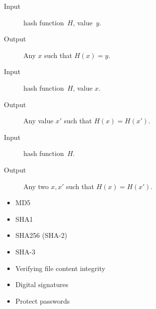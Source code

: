 \begin{frame}
  \begin{definition}
    \begin{description}
      \item[Input] hash function~\(H\), value~\(y\).
      \item[Output] Any \(x\) such that \(H(x) = y\).
    \end{description}
  \end{definition}

  \begin{definition}
    \begin{description}
      \item[Input] hash function~\(H\), value \(x\).
      \item[Output] Any value \(x'\) such that \(H(x) = H(x')\).
    \end{description}
  \end{definition}

  \begin{definition}
    \begin{description}
      \item[Input] hash function~\(H\).
      \item[Output] Any two \(x, x'\) such that \(H(x) = H(x')\).
    \end{description}
  \end{definition}
\end{frame}

\begin{frame}
  \begin{example}
    \begin{itemize}
      \item MD5
      \item SHA1
      \item SHA256 (SHA-2)
      \item SHA-3
    \end{itemize}
  \end{example}
  \begin{example}[Applications]
    \begin{itemize}
      \item Verifying file content integrity
      \item Digital signatures
      \item Protect passwords
    \end{itemize}
  \end{example}
\end{frame}

